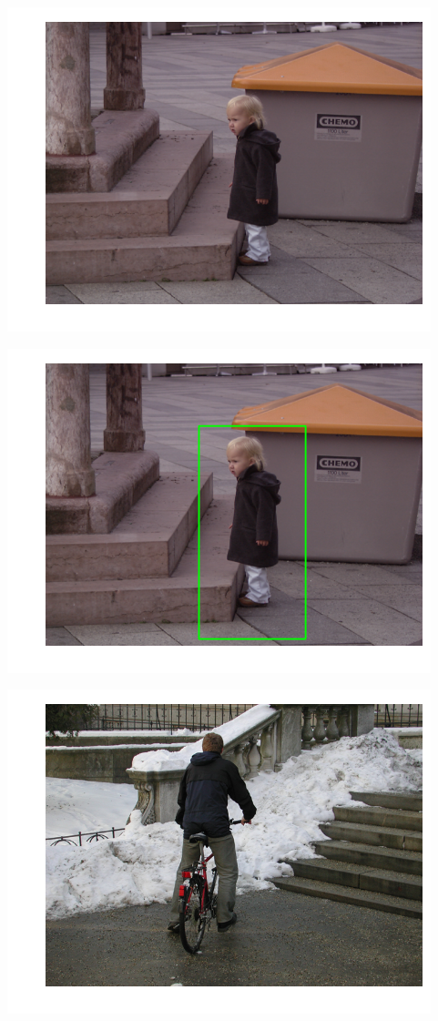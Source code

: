 \includegraphics{facedetection_files/facedetection_62_2.png}

\includegraphics{facedetection_files/facedetection_62_3.png}

\includegraphics{facedetection_files/facedetection_62_4.png}

